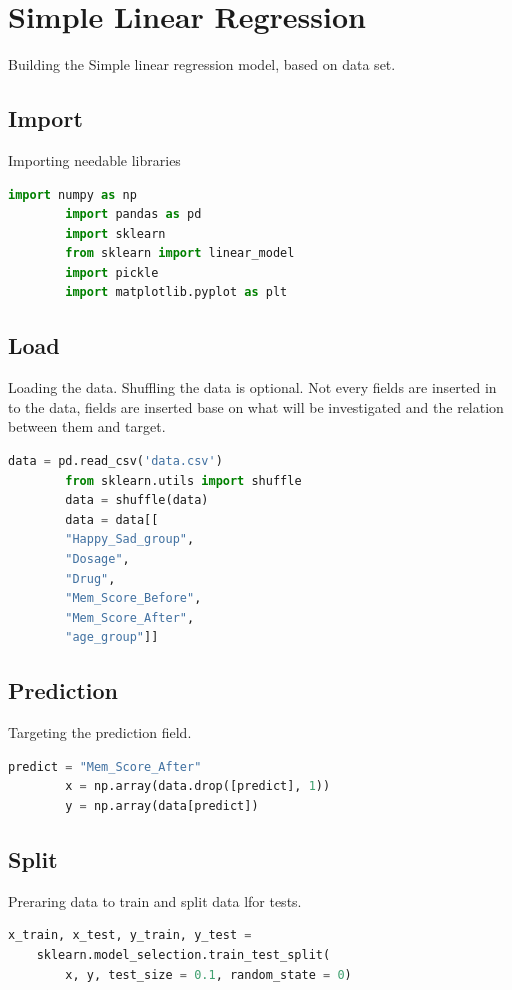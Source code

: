 \documentclass{article}
\begin{document}

    \section{Simple Linear Regression}
    Building the Simple linear regression model, based on data set.
    \subsection{Import} Importing needable libraries
    \begin{lstlisting}[language=Python]
        import numpy as np
        import pandas as pd
        import sklearn
        from sklearn import linear_model
        import pickle
        import matplotlib.pyplot as plt
    \end{lstlisting}
    \subsection{Load}
    Loading the data.
    Shuffling the data is optional.
    Not every fields are inserted in to the data, fields are
    inserted base on what will be investigated and the relation
    between them and target.
    \begin{lstlisting}[language=Python]
        data = pd.read_csv('data.csv')
        from sklearn.utils import shuffle
        data = shuffle(data)
        data = data[[
        "Happy_Sad_group",
        "Dosage",
        "Drug",
        "Mem_Score_Before",
        "Mem_Score_After",
        "age_group"]]
    \end{lstlisting}
    \subsection{Prediction}
    Targeting the prediction field.
    \begin{lstlisting}[language=Python]
        predict = "Mem_Score_After"
        x = np.array(data.drop([predict], 1))
        y = np.array(data[predict])
    \end{lstlisting}
    \subsection{Split}
    Preraring data to train and split data lfor tests.
    \begin{lstlisting}[language=Python]
x_train, x_test, y_train, y_test =
    sklearn.model_selection.train_test_split(
        x, y, test_size = 0.1, random_state = 0)
    \end{lstlisting}
\end{document}
